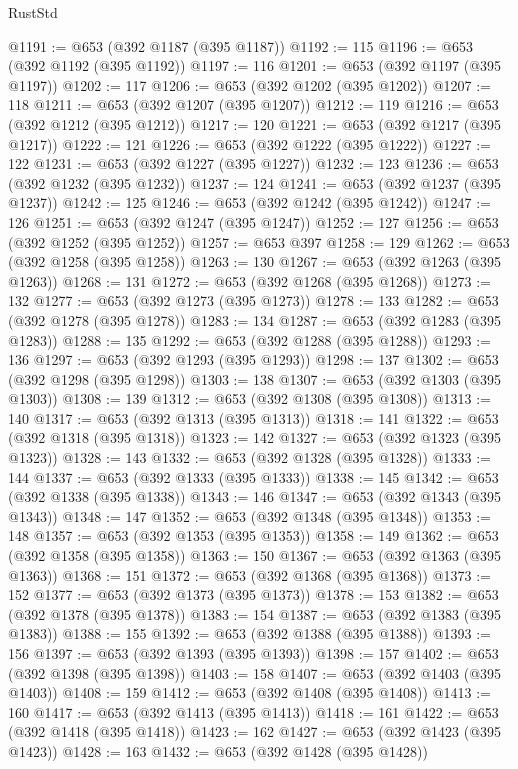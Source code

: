 \begin{lexlean}{RustStd}
\begin{coremodule}
@1191 := @653 (@392 @1187 (@395 @1187))
@1192 := 115
@1196 := @653 (@392 @1192 (@395 @1192))
@1197 := 116
@1201 := @653 (@392 @1197 (@395 @1197))
@1202 := 117
@1206 := @653 (@392 @1202 (@395 @1202))
@1207 := 118
@1211 := @653 (@392 @1207 (@395 @1207))
@1212 := 119
@1216 := @653 (@392 @1212 (@395 @1212))
@1217 := 120
@1221 := @653 (@392 @1217 (@395 @1217))
@1222 := 121
@1226 := @653 (@392 @1222 (@395 @1222))
@1227 := 122
@1231 := @653 (@392 @1227 (@395 @1227))
@1232 := 123
@1236 := @653 (@392 @1232 (@395 @1232))
@1237 := 124
@1241 := @653 (@392 @1237 (@395 @1237))
@1242 := 125
@1246 := @653 (@392 @1242 (@395 @1242))
@1247 := 126
@1251 := @653 (@392 @1247 (@395 @1247))
@1252 := 127
@1256 := @653 (@392 @1252 (@395 @1252))
@1257 := @653 @397
@1258 := 129
@1262 := @653 (@392 @1258 (@395 @1258))
@1263 := 130
@1267 := @653 (@392 @1263 (@395 @1263))
@1268 := 131
@1272 := @653 (@392 @1268 (@395 @1268))
@1273 := 132
@1277 := @653 (@392 @1273 (@395 @1273))
@1278 := 133
@1282 := @653 (@392 @1278 (@395 @1278))
@1283 := 134
@1287 := @653 (@392 @1283 (@395 @1283))
@1288 := 135
@1292 := @653 (@392 @1288 (@395 @1288))
@1293 := 136
@1297 := @653 (@392 @1293 (@395 @1293))
@1298 := 137
@1302 := @653 (@392 @1298 (@395 @1298))
@1303 := 138
@1307 := @653 (@392 @1303 (@395 @1303))
@1308 := 139
@1312 := @653 (@392 @1308 (@395 @1308))
@1313 := 140
@1317 := @653 (@392 @1313 (@395 @1313))
@1318 := 141
@1322 := @653 (@392 @1318 (@395 @1318))
@1323 := 142
@1327 := @653 (@392 @1323 (@395 @1323))
@1328 := 143
@1332 := @653 (@392 @1328 (@395 @1328))
@1333 := 144
@1337 := @653 (@392 @1333 (@395 @1333))
@1338 := 145
@1342 := @653 (@392 @1338 (@395 @1338))
@1343 := 146
@1347 := @653 (@392 @1343 (@395 @1343))
@1348 := 147
@1352 := @653 (@392 @1348 (@395 @1348))
@1353 := 148
@1357 := @653 (@392 @1353 (@395 @1353))
@1358 := 149
@1362 := @653 (@392 @1358 (@395 @1358))
@1363 := 150
@1367 := @653 (@392 @1363 (@395 @1363))
@1368 := 151
@1372 := @653 (@392 @1368 (@395 @1368))
@1373 := 152
@1377 := @653 (@392 @1373 (@395 @1373))
@1378 := 153
@1382 := @653 (@392 @1378 (@395 @1378))
@1383 := 154
@1387 := @653 (@392 @1383 (@395 @1383))
@1388 := 155
@1392 := @653 (@392 @1388 (@395 @1388))
@1393 := 156
@1397 := @653 (@392 @1393 (@395 @1393))
@1398 := 157
@1402 := @653 (@392 @1398 (@395 @1398))
@1403 := 158
@1407 := @653 (@392 @1403 (@395 @1403))
@1408 := 159
@1412 := @653 (@392 @1408 (@395 @1408))
@1413 := 160
@1417 := @653 (@392 @1413 (@395 @1413))
@1418 := 161
@1422 := @653 (@392 @1418 (@395 @1418))
@1423 := 162
@1427 := @653 (@392 @1423 (@395 @1423))
@1428 := 163
@1432 := @653 (@392 @1428 (@395 @1428))

\end{coremodule}
\end{lexlean}
